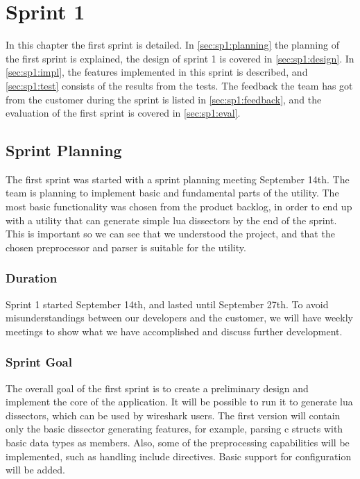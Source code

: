 \chapter{Sprint 1}
In this chapter the first sprint is detailed. In \autoref{sec:sp1:planning} 
the planning of the first sprint is explained, the design of sprint 1 is 
covered in \autoref{sec:sp1:design}. In \autoref{sec:sp1:impl}, the 
features implemented in this sprint is described, and \autoref{sec:sp1:test} consists of 
the results from the tests. The feedback the team has got from the customer 
during the sprint is listed in \autoref{sec:sp1:feedback}, and the evaluation 
of the first sprint is covered in \autoref{sec:sp1:eval}.


\section{Sprint Planning}
\label{sec:sp1:planning}
The first sprint was started with a sprint planning meeting September 14th. 
The team is planning to implement basic and fundamental parts of the 
\gls{utility}. The most basic functionality was chosen from the product 
backlog, in order to end up with a utility that can generate simple 
\Gls{lua} \glspl{dissector} by the end of the sprint. This is important so we can see that we 
understood the project, and that the chosen \gls{preprocessor} and 
\gls{parser} is suitable for the utility.

\subsection{Duration}
Sprint 1 started September 14th, and lasted until September 27th. To avoid
misunderstandings between our developers and the customer, we will have weekly
meetings to show what we have accomplished and discuss further development. 

\subsection{Sprint Goal}
The overall goal of the first sprint is to create a preliminary design and
implement the core of the application. It will be possible to run it to
generate \Gls{lua} \glspl{dissector}, which can be used by \Gls{wireshark} users. The first
version will contain only the basic \gls{dissector} generating features, for example,
parsing \Gls{c} \glspl{struct} with basic data types as \glspl{member}. Also, some of the
preprocessing capabilities will be implemented, such as handling \gls{include}
directives. Basic support for configuration will be added.

